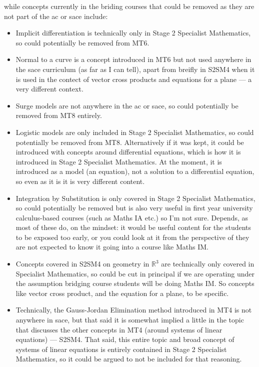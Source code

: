 \documentclass[twoside,12pt,a4paper]{report}
\begin{document}
while concepts currently in the briding courses that could be removed as they are not part of the \gls{ac} or \gls{sace} include:
\begin{itemize}
	\item Implicit differentiation is technically only in Stage 2 Specialist Mathematics, so could potentially be removed from MT6.
	\item Normal to a curve is a concept introduced in MT6 but not used anywhere in the \gls{sace} curriculum (as far as I can tell), apart from breifly in S2SM4 when it is used in the contect of vector cross products and equations for a plane --- a very different context.
	\item Surge models are not anywhere in the \gls{ac} or \gls{sace}, so could potentially be removed from MT8 entirely.	
	\item Logistic models are only included in Stage 2 Specialist Mathematics, so could potentially be removed from MT8. Alternatively if it was kept, it could be introduced with concepts around differential equations, which is how it is introduced in Stage 2 Specialist Mathematics. At the moment, it is introduced as a model (an equation), not a solution to a differential equation, so even as it is it is very different content.
	\item Integration by Substitution is only covered in Stage 2 Specialist Mathematics, so could potentially be removed but is also very useful in first year university calculus-based courses (such as Maths IA etc.) so I'm not sure. Depends, as most of these do, on the mindset: it would be useful content for the students to be exposed too early, or you could look at it from the perspective of they are not expected to know it going into a course like Maths IM. 
	\item Concepts covered in S2SM4 on geometry in $\mathbb{R}^3$ are technically only covered in Specialist Mathematics, so could be cut in principal if we are operating under the assumption bridging course students will be doing Maths IM. So concepts like vector cross product, and the equation for a plane, to be specific.
	\item Technically, the Gauss-Jordan Elimination method introduced in MT4 is not anywhere in \gls{sace}, but that said it is somewhat implied a little in the topic that discusses the other concepts in MT4 (around systems of linear equations) --- S2SM4. That said, this entire topic and broad concept of systems of linear equations is entirely contained in Stage 2 Specialist Mathematics, so it could be argued to not be included for that reasoning.
\end{itemize}
\end{document}
